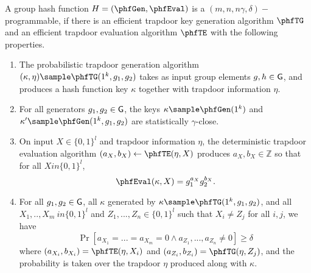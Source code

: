 \begin{definition}
A group hash function $H = (\phfGen, \phfEval)$ is a $(m,n,n\gamma,\delta)-$programmable, if there is an efficient trapdoor key generation algorithm $\phfTG$ and an efficient trapdoor evaluation algorithm $\phfTE$ with the following properties.
\begin{enumerate}
\item The probabilistic  trapdoor generation algorithm 
$(\kappa, \eta) \sample \phfTG(1^k,g_1,g_2)$ takes as input group elements 
$g,h \in \mathsf{G}$, and produces a hash function key $\kappa$ together with trapdoor information 
$\eta$.
\item For all generators
$g_1,g_2 \in \mathsf{G}$, the keys 
$\kappa \sample \phfGen(1^k)$ and 
$\kappa' \sample \phfGen(1^k,g_1,g_2)$ are statistically
$\gamma$-close.
\item 
On input $X \in \{0,1\}^l$ and trapdoor information $\eta$, the deterministic trapdoor evaluation algorithm
$(a_X,b_X) \leftarrow \phfTE(\eta,X)$ produces $a_X,b_X \in \mathbb{Z}$ so that for all 
$Xin \{0,1\}^l$,
$$\phfEval(\kappa, X) = g_1^{a_X}g_2^{b_X}.$$
\item For all $g_1,g_2 \in \mathsf{G}$, all $\kappa$ generated by 
$\kappa \sample \phfTG(1^k,g_1,g_2)$, and all 
$X_1,..,X_m \ in \{0,1\}^l$ and
$Z_1,...,Z_n \in \{0,1\}^l$ such that $X_i \neq Z_j$ for all $i,j$, we have
$$\Pr[a_{X_1}=...=a_{X_m}= 0 \land a_{Z_1},...,a_{Z_n} \neq 0]\geq \delta$$
where 
$(a_{X_i},b_{X_i}) = \phfTE(\eta, X_i)$ and $(a_{Z_i},b_{Z_i}) = \phfTG(\eta, Z_j)$, and the probability is taken over the trapdoor $\eta$ produced along with $\kappa$.
\end{enumerate}
\end{definition}











